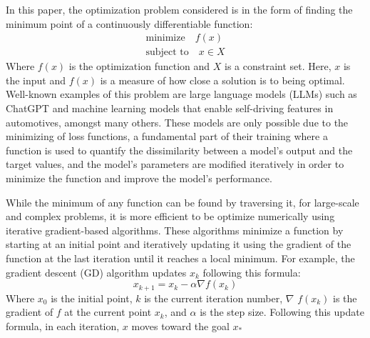 In this paper, the optimization problem considered is in the form of finding the minimum point of a continuously differentiable function:
\begin{subequations}\label{opt prob}
  \begin{align}
    \textrm{minimize} \quad f(x) \\
    \textrm{subject to} \quad x \in X
  \end{align}
\end{subequations}
Where \(f(x)\) is the optimization function and \(X\) is a constraint set. Here, \(x\) is the input and \(f(x)\) is a measure of how close a solution is to being optimal. Well-known examples of this problem are large language models (LLMs) such as ChatGPT and machine learning models that enable self-driving features in automotives, amongst many others. These models are only possible due to the minimizing of loss functions, a fundamental part of their training where a function is used to quantify the dissimilarity between a model's output and the target values, and the model's parameters are modified iteratively in order to minimize the function and improve the model's performance.

While the minimum of any function can be found by traversing it, for large-scale and complex problems, it is more efficient to be optimize numerically using iterative gradient-based  algorithms. These algorithms minimize a function by starting at an initial point and iteratively updating it using the gradient of the function at the last iteration until it reaches a local minimum. For example, the gradient descent (GD) algorithm updates \(x_k\) following this formula:
\begin{equation}\label{eqn:GD}
  x_{k+1}=x_{k}-\alpha \nabla f(x_k)
\end{equation}
Where \(x_{0}\) is the initial point, \(k\) is the current iteration number, $\nabla$ \(f(x_k)\) is the gradient of \(f\) at the current point \(x_k\), and $\alpha$ is the step size. Following this update formula, in each iteration, \(x\) moves toward the goal \(x_*\)

